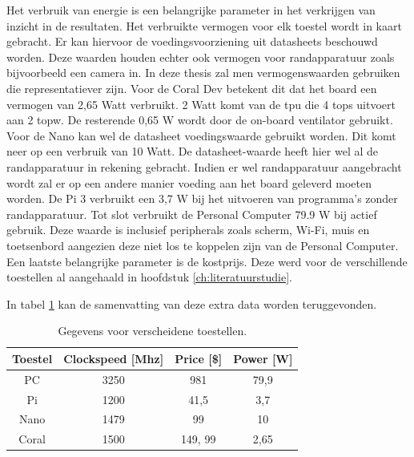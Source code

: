 Het verbruik van energie is een belangrijke parameter in het verkrijgen van inzicht in de resultaten. Het verbruikte vermogen voor elk toestel wordt in kaart gebracht. Er kan hiervoor de voedingsvoorziening uit datasheets beschouwd worden. Deze waarden houden echter ook vermogen voor randapparatuur zoals bijvoorbeeld een camera in. In deze thesis zal men vermogenswaarden gebruiken die representatiever zijn. Voor de Coral Dev betekent dit dat het board een vermogen van 2,65 Watt verbruikt. 2 Watt komt van de \gls{tpu} die 4 \gls{tops} uitvoert aan 2 \gls{topw}. De resterende 0,65 W wordt door de on-board ventilator gebruikt. Voor de Nano kan wel de datasheet voedingswaarde gebruikt worden. Dit komt neer op een verbruik van 10 Watt. De datasheet-waarde heeft hier wel al de randapparatuur in rekening gebracht. Indien er wel randapparatuur aangebracht wordt zal er op een andere manier voeding aan het board geleverd moeten worden. De Pi 3 verbruikt een 3,7 W bij het uitvoeren van programma's zonder randapparatuur. Tot slot verbruikt de Personal Computer 79.9 W bij actief gebruik. Deze waarde is inclusief peripherals zoals scherm, Wi-Fi, muis en toetsenbord aangezien deze niet los te koppelen zijn van de Personal Computer.\\
Een laatste belangrijke parameter is de kostprijs. Deze werd voor de verschillende toestellen al aangehaald in hoofdstuk \ref{ch:literatuurstudie}.
	
In tabel \ref{tab:datadevices} kan de samenvatting van deze extra data worden teruggevonden. 
	
	\begin{table}[]
		\centering
		\begin{tabular}{cccc}
			\hline
			Toestel                    & Clockspeed {[}Mhz{]} & Price {[}\${]} & Power {[}W{]} \\ \hline
			\multicolumn{1}{c|}{PC}    & 3250                 & 981            & 79,9          \\
			\multicolumn{1}{c|}{Pi}    & 1200                 & 41,5           & 3,7           \\
			\multicolumn{1}{c|}{Nano}  & 1479                 & 99             & 10            \\
			\multicolumn{1}{c|}{Coral} & 1500                 & 149, 99        & 2,65          \\ \hline
		\end{tabular}
		\caption{Gegevens voor verscheidene toestellen.}
		\label{tab:datadevices}
	\end{table}


